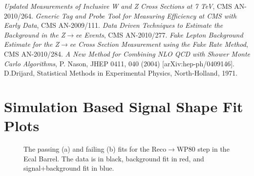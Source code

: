 \newpage
\begin{thebibliography}{10}
\textit{Updated Measurements of Inclusive W and Z Cross Sections at 7 TeV}, CMS AN-2010/264.
\textit{Generic Tag and Probe Tool for Measuring Efficiency at CMS with Early Data}, CMS AN-2009/111.
\textit{Data Driven Techniques to Estimate the Background in the Z$\to$ee Events}, CMS AN-2010/277.
\textit{Fake Lepton Background Estimate for the Z$\to$ee Cross Section Measurement using the Fake Rate Method}, CMS AN-2010/284.
\textit{A New Method for Combining NLO QCD with Shower Monte Carlo Algorithms},
P. Nason, JHEP 0411, 040 (2004) [arXiv:hep-ph/0409146].
D.Drijard, Statistical Methods in Experimental Physics, North-Holland, 1971.

\newpage


\appendix 
\section{Simulation Based Signal Shape Fit Plots}
\label{SimulatiobSignalShapeFitPlots}

\begin{figure}[htb]
  \begin{center}
    \caption{The passing (a) and failing (b) fits for the Reco$\to$WP80 step in the Ecal Barrel.
             The data is in black, background fit in red, and signal+background fit in blue.}
  \end{center}
\end{figure}


\end{thebibliography}
